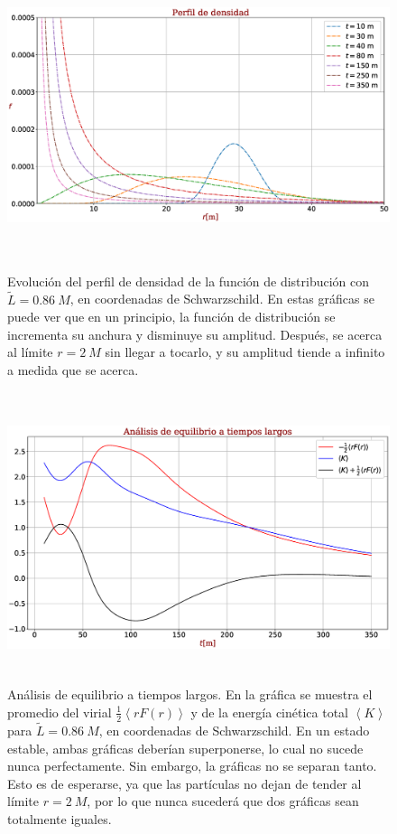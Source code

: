\documentclass[11pt,twoside,openright,spanish]{report}
\numberwithin{equation}{chapter}
\numberwithin{figure}{chapter}
\numberwithin{table}{chapter}
\begin{document}
\begin{figure}[H]
	\centering
	\includegraphics[height=9cm]{graphs_study/LmenorSchGraphs/densityProfileLmenorSch}
	\caption{Evolución del perfil de densidad de la función de distribución con $\tilde{L}=0.86\ M$, en coordenadas de Schwarzschild. En estas gráficas se puede ver que en un principio, la función de distribución se incrementa su anchura y disminuye su amplitud. Después, se acerca al límite $r=2\ M$ sin llegar a tocarlo, y su amplitud tiende a infinito a medida que se acerca.}
	\label{densityProfileSchLmenor}
\end{figure}

\begin{figure}[H]
	\centering
	\includegraphics[height=8.5cm]{graphs_study/LmenorSchGraphs/stabilitySchMenor.eps}
	\caption{Análisis de equilibrio a tiempos largos. En la gráfica se muestra el promedio del virial $\frac{1}{2}\left<rF(r)\right>$ y de la energía cinética total $\left<K\right>$ para $\tilde{L}=0.86\ M$, en coordenadas de Schwarzschild. En un estado estable, ambas gráficas deberían superponerse, lo cual no sucede nunca perfectamente. Sin embargo, la gráficas no se separan tanto. Esto es de esperarse, ya que las partículas no dejan de tender al límite $r=2\ M$, por lo que nunca sucederá que dos gráficas sean totalmente iguales.}
	\label{stabilitySchmenor}
\end{figure}
\end{document}
